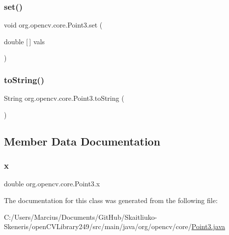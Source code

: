 \mbox{\label{classorg_1_1opencv_1_1core_1_1_point3_af2e7834d731c39649945d569c720c00d}} 
\subsubsection{\texorpdfstring{set()}{set()}}
{\footnotesize\ttfamily void org.\+opencv.\+core.\+Point3.\+set (\begin{DoxyParamCaption}\item[{double \mbox{[}$\,$\mbox{]}}]{vals }\end{DoxyParamCaption})}

\mbox{\label{classorg_1_1opencv_1_1core_1_1_point3_a009debefdc9246adf04a2c1f4a3dd2f4}} 
\subsubsection{\texorpdfstring{to\+String()}{toString()}}
{\footnotesize\ttfamily String org.\+opencv.\+core.\+Point3.\+to\+String (\begin{DoxyParamCaption}{ }\end{DoxyParamCaption})}



\subsection{Member Data Documentation}
\mbox{\label{classorg_1_1opencv_1_1core_1_1_point3_a0f6ddd298923e45df4b250ef1c97c270}} 
\subsubsection{\texorpdfstring{x}{x}}
{\footnotesize\ttfamily double org.\+opencv.\+core.\+Point3.\+x}



The documentation for this class was generated from the following file\+:\begin{DoxyCompactItemize}
\item 
C\+:/\+Users/\+Marcius/\+Documents/\+Git\+Hub/\+Skaitliuko-\/\+Skeneris/open\+C\+V\+Library249/src/main/java/org/opencv/core/\mbox{\hyperlink{_point3_8java}{Point3.\+java}}\end{DoxyCompactItemize}
